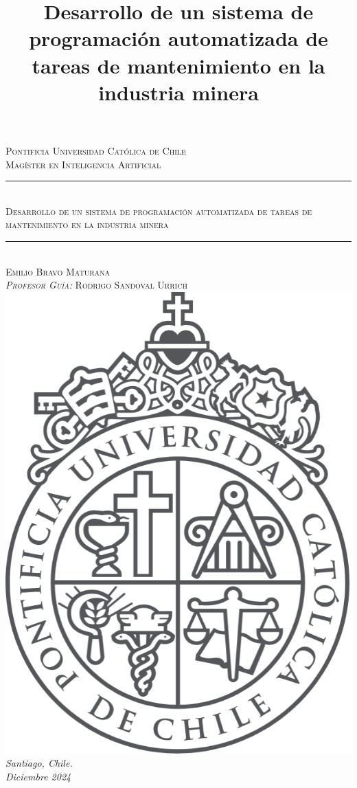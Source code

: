 \documentclass{article}
\title{Desarrollo de un sistema de programación automatizada de tareas de mantenimiento en la industria minera}
\date{}
\begin{document}
\begin{titlepage}
\newcommand{\HRule}{\rule{\linewidth}{0.5mm}}
\center
\textsc{\LARGE Pontificia Universidad Católica de Chile}\\[1cm] 
\textsc{\large Magíster en Inteligencia Artificial}\\[0.5cm] 
\HRule \\[0.4cm]
\huge \textsc{Desarrollo de un sistema de programación automatizada de tareas de mantenimiento en la industria minera}\\[0.1cm]
\HRule \\[1cm]
\large\textsc{Emilio Bravo Maturana\\\emph{Profesor Guía: }Rodrigo Sandoval Urrich}\\[1cm]
\includegraphics[scale=0.2]{imgs/UC Logo Grande.png}\\[1cm]
\vfill
{\large\emph{Santiago, Chile. \\ Diciembre 2024 }}\\[2cm]


\end{titlepage}
\end{document}
